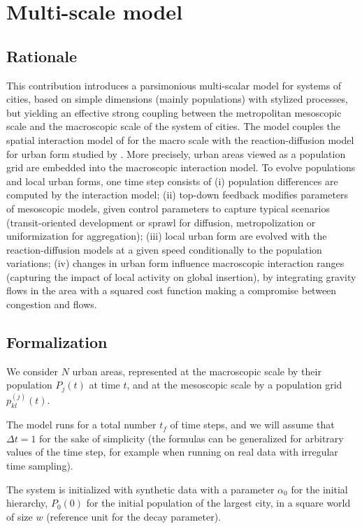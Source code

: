 \documentclass[11pt]{article}
\begin{document}
\section{Multi-scale model}

\subsection{Rationale}

This contribution introduces a parsimonious multi-scalar model for systems of cities, based on simple dimensions (mainly populations) with stylized processes, but yielding an effective strong coupling between the metropolitan mesoscopic scale and the macroscopic scale of the system of cities. The model couples the spatial interaction model of \cite{raimbault2018indirect} for the macro scale with the reaction-diffusion model for urban form studied by \cite{raimbault2018calibration}. More precisely, urban areas viewed as a population grid are embedded into the macroscopic interaction model. To evolve populations and local urban forms, one time step consists of (i) population differences are computed by the interaction model; (ii) top-down feedback modifies parameters of mesoscopic models, given control parameters to capture typical scenarios (transit-oriented development or sprawl for diffusion, metropolization or uniformization for aggregation); (iii) local urban form are evolved with the reaction-diffusion models at a given speed conditionally to the population variations; (iv) changes in urban form influence macroscopic interaction ranges (capturing the impact of local activity on global insertion), by integrating gravity flows in the area with a squared cost function making a compromise between congestion and flows.


\subsection{Formalization}


We consider $N$ urban areas, represented at the macroscopic scale by their population $P_j(t)$ at time $t$, and at the mesoscopic scale by a population grid $p_{kl}^{(j)}(t)$.

The model runs for a total number $t_f$ of time steps, and we will assume that $\Delta t = 1$ for the sake of simplicity (the formulas can be generalized for arbitrary values of the time step, for example when running on real data with irregular time sampling).

The system is initialized with synthetic data with a parameter $\alpha_0$ for the initial hierarchy, $P_0 (0)$ for the initial population of the largest city, in a square world of size $w$ (reference unit for the decay parameter).
\end{document}
